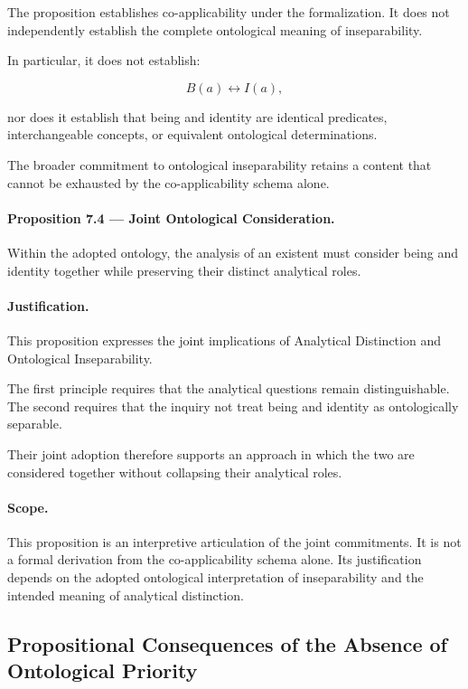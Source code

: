 The proposition establishes co-applicability under the
formalization. It does not independently establish the complete
ontological meaning of inseparability.

In particular, it does not establish:

\[
    B(a) \leftrightarrow I(a),
\]

nor does it establish that being and identity are identical
predicates, interchangeable concepts, or equivalent ontological
determinations.

The broader commitment to ontological inseparability retains
a content that cannot be exhausted by the co-applicability
schema alone.

\paragraph{Proposition 7.4 — Joint Ontological Consideration.}

Within the adopted ontology, the analysis of an existent
must consider being and identity together while preserving
their distinct analytical roles.

\paragraph{Justification.}

This proposition expresses the joint implications of
Analytical Distinction and Ontological Inseparability.

The first principle requires that the analytical questions
remain distinguishable. The second requires that the inquiry
not treat being and identity as ontologically separable.

Their joint adoption therefore supports an approach in which
the two are considered together without collapsing their
analytical roles.

\paragraph{Scope.}

This proposition is an interpretive articulation of the
joint commitments. It is not a formal derivation from the
co-applicability schema alone. Its justification depends
on the adopted ontological interpretation of inseparability
and the intended meaning of analytical distinction.

\subsection{Propositional Consequences of the Absence of
Ontological Priority}

